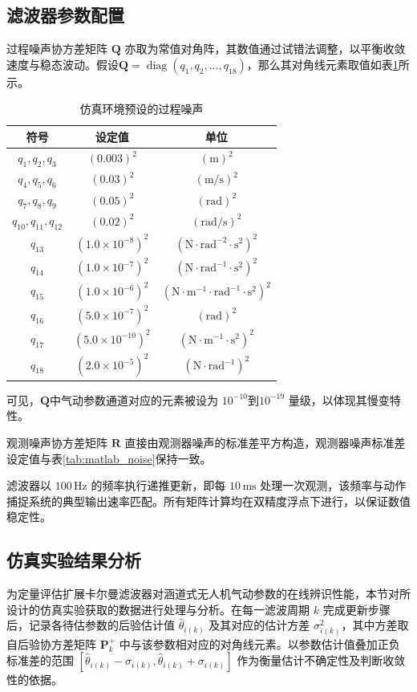 \subsection{滤波器参数配置}
过程噪声协方差矩阵 $\boldsymbol{Q}$ 亦取为常值对角阵，其数值通过试错法调整，以平衡收敛速度与稳态波动。假设$\boldsymbol{Q} = \operatorname{diag}(q_1, q_2, \dots, q_{18})$，那么其对角线元素取值如表\ref{tab:Q_set}所示。
\begin{table}[htbp]
    \centering
    \caption{仿真环境预设的过程噪声}
    \label{tab:Q_set}
    \begin{tabular}{ccc}
    \toprule
    符号 & 设定值 & 单位 \\
    \midrule
    $q_1,q_2,q_3$ & $(0.003)^2$ & $\mathrm{(m)^2}$ \\
    $q_4,q_5,q_6$ & $(0.03)^2$ & $\mathrm{(m/s)^2}$ \\
    $q_7,q_8,q_9$ & $(0.05)^2$ & $\mathrm{(rad)^2}$ \\
    $q_{10},q_{11},q_{12}$ & $(0.02)^2$ & $\mathrm{(rad/s)^2}$ \\
    $q_{13}$ & $(1.0 \times 10^{-8})^2$ & $\mathrm{(N \cdot rad ^{-2} \cdot s^2)^2}$\\
    $q_{14}$ & $(1.0 \times 10^{-7})^2$ & $\mathrm{(N \cdot rad ^{-1} \cdot s^2)^2}$\\
    $q_{15}$ & $(1.0 \times 10^{-6})^2$ & $\mathrm{(N \cdot m^{-1} \cdot rad ^{-1} \cdot s^2)^2}$\\
    $q_{16}$ & $(5.0 \times 10^{-7})^2$ & $\mathrm{(rad)^2}$\\
    $q_{17}$ & $(5.0 \times 10^{-10})^2$ & $\mathrm{(N \cdot m^{-1} \cdot s^2)^2}$\\
    $q_{18}$ & $(2.0 \times 10^{-5})^2$ & $\mathrm{(N \cdot rad^{-1})^2}$\\
    \bottomrule
    \end{tabular}
\end{table}
可见，$\boldsymbol{Q}$中气动参数通道对应的元素被设为 $10^{-10}$到$10^{-19}$ 量级，以体现其慢变特性。

观测噪声协方差矩阵 $\boldsymbol{R}$ 直接由观测器噪声的标准差平方构造，观测器噪声标准差设定值与表\ref{tab:matlab_noise}保持一致。

滤波器以 $100\,\mathrm{Hz}$ 的频率执行递推更新，即每 $10\,\mathrm{ms}$ 处理一次观测，该频率与动作捕捉系统的典型输出速率匹配。所有矩阵计算均在双精度浮点下进行，以保证数值稳定性。

\subsection{仿真实验结果分析}
为定量评估扩展卡尔曼滤波器对涵道式无人机气动参数的在线辨识性能，本节对所设计的仿真实验获取的数据进行处理与分析。在每一滤波周期 \(k\) 完成更新步骤后，记录各待估参数的后验估计值 \(\hat{\theta}_{i(k)}\) 及其对应的估计方差 \(\sigma_{i(k)}^2\)，其中方差取自后验协方差矩阵 \(\boldsymbol{P}_k^+\) 中与该参数相对应的对角线元素。以参数估计值叠加正负标准差的范围 \(\left[\hat{\theta}_{i(k)} - \sigma_{i(k)}, \hat{\theta}_{i(k)} + \sigma_{i(k)}\right]\) 作为衡量估计不确定性及判断收敛性的依据。

